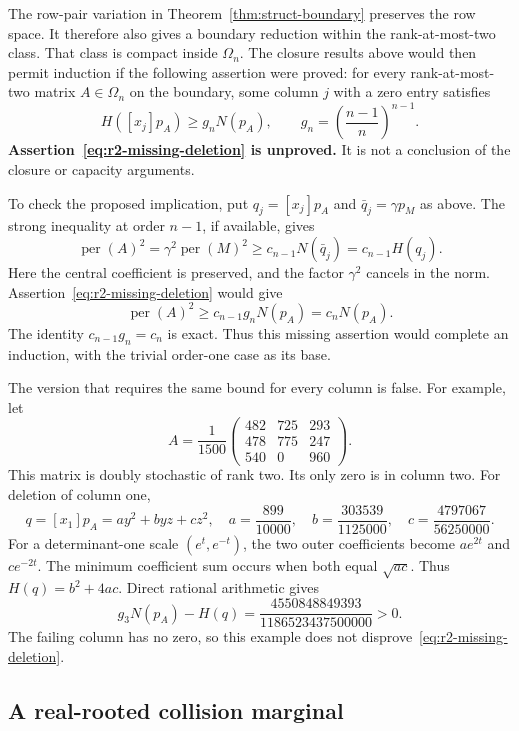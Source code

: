 \documentclass[11pt,a4paper]{article}
\theoremstyle{definition}
\theoremstyle{remark}
\newcommand{\per}{\operatorname{per}}
\begin{document}
The row-pair variation in Theorem~\ref{thm:struct-boundary} preserves the row space.
It therefore also gives a boundary reduction within the rank-at-most-two class.
That class is compact inside $\Omega_n$.
The closure results above would then permit induction if the following assertion were proved:
for every rank-at-most-two matrix $A\in\Omega_n$ on the boundary, some column $j$ with a zero entry satisfies
\begin{equation}\label{eq:r2-missing-deletion}
 H([x_j]p_A)\ge g_nN(p_A),
 \qquad g_n=\left(\frac{n-1}{n}\right)^{n-1}.
\end{equation}
\textbf{Assertion~\eqref{eq:r2-missing-deletion} is unproved.}
It is not a conclusion of the closure or capacity arguments.

To check the proposed implication, put $q_j=[x_j]p_A$ and $\bar q_j=\gamma p_M$ as above.
The strong inequality at order $n-1$, if available, gives
\[
 \per(A)^2
 =\gamma^2\per(M)^2
 \ge c_{n-1}N(\bar q_j)
 =c_{n-1}H(q_j).
\]
Here the central coefficient is preserved, and the factor $\gamma^2$ cancels in the norm.
Assertion~\eqref{eq:r2-missing-deletion} would give
\[
 \per(A)^2\ge c_{n-1}g_nN(p_A)=c_nN(p_A).
\]
The identity $c_{n-1}g_n=c_n$ is exact.
Thus this missing assertion would complete an induction, with the trivial order-one case as its base.

The version that requires the same bound for every column is false.
For example, let
\[
 A=\frac1{1500}
 \begin{pmatrix}482&725&293\\478&775&247\\540&0&960\end{pmatrix}.
\]
This matrix is doubly stochastic of rank two.
Its only zero is in column two.
For deletion of column one,
\[
 q=[x_1]p_A=a y^2+b yz+c z^2,
 \quad
 a=\frac{899}{10000},\quad b=\frac{303539}{1125000},\quad
 c=\frac{4797067}{56250000}.
\]
For a determinant-one scale $(e^t,e^{-t})$, the two outer coefficients become $ae^{2t}$ and $ce^{-2t}$.
The minimum coefficient sum occurs when both equal $\sqrt{ac}$.
Thus $H(q)=b^2+4ac$.
Direct rational arithmetic gives
\[
 g_3N(p_A)-H(q)=\frac{4550848849393}{1186523437500000}>0.
\]
The failing column has no zero, so this example does not disprove~\eqref{eq:r2-missing-deletion}.

\subsection{A real-rooted collision marginal}
\end{document}
